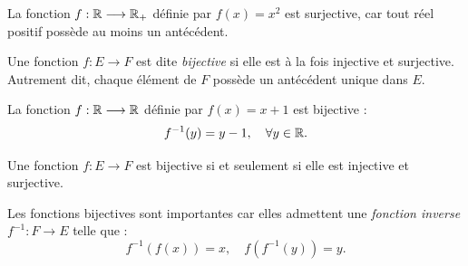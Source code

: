 \begin{example}
    La fonction $f : \mathbb{R} \longrightarrow \mathbb{R}_+$ définie par $f(x) = x^2$ est surjective, car tout réel positif possède au moins un antécédent.
\end{example}


\begin{definition}
    Une fonction $f : E \longrightarrow F$ est dite \emph{bijective} si elle est à la fois injective et surjective. Autrement dit, chaque élément de $F$ possède un antécédent unique dans $E$.
\end{definition}

\begin{example}
    La fonction $f : \mathbb{R} \longrightarrow \mathbb{R}$ définie par $f(x) = x + 1$ est bijective :
    \[
        f^{-1}(y) = y-1, \quad \forall y \in \mathbb{R}.
    \]
\end{example}

\begin{prop}[Caractérisation]
    Une fonction $f : E \longrightarrow F$ est bijective si et seulement si elle est injective et surjective.
\end{prop}

\begin{remark}
    Les fonctions bijectives sont importantes car elles admettent une \emph{fonction inverse} $f^{-1} : F \longrightarrow E$ telle que :
    \[
        f^{-1}(f(x)) = x, \quad f(f^{-1}(y)) = y.
    \]
\end{remark}
